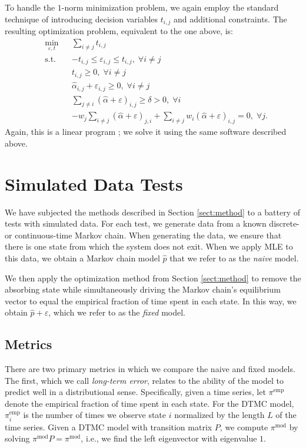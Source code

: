 \documentclass[review,letterpaper,11pt]{elsarticle}
\begin{document}
To handle the $1$-norm minimization problem, we again employ the standard technique of introducing decision variables $t_{i,j}$ and additional constraints.  The resulting optimization problem, equivalent to the one above, is:
\begin{equation}
\label{eqn:ctmcopt2}
\begin{aligned}
& \underset{\varepsilon, t}{\text{min}} && \sum_{i \neq j} t_{i,j} \\
& \text{s.t.}
& & -t_{i,j} \leq \varepsilon_{i,j} \leq t_{i,j}, \;  \forall i \neq j\\
&&& t_{i,j} \geq 0, \;  \forall i \neq j \\
&&& \widehat{\alpha}_{i,j} + \varepsilon_{i,j} \geq 0, \;  \forall i \neq j \\
&&& \sum_{j \neq i} (\widehat{\alpha} + \varepsilon)_{i,j} \geq \delta > 0, \;  \forall i \\
&&& -w_j \sum_{i \neq j} (\widehat{\alpha} + \varepsilon)_{j,i} + \sum_{i \neq j } w_i (\widehat{\alpha} + \varepsilon)_{i,j} = 0, \;  \forall j.
\end{aligned}
\end{equation}
Again, this is a linear program \cite{Nocedal2006}; we solve it using the same software described above.

\section{Simulated Data Tests}
\label{sect:simdata}
We have subjected the methods described in Section \ref{sect:method} to a battery of tests with simulated data.  For each test, we generate data from a known discrete- or continuous-time Markov chain.  When generating the data, we ensure that there is one state from which the system does not exit.  When we apply MLE to this data, we obtain a Markov chain model $\widehat{p}$ that we refer to as the \emph{naive} model.

We then apply the optimization method from Section \ref{sect:method} to remove the absorbing state while simultaneously driving the Markov chain's equilibrium vector to equal the empirical fraction of time spent in each state.  In this way, we obtain $\widehat{p} + \varepsilon$, which we refer to as the \emph{fixed} model.

\subsection{Metrics}
There are two primary metrics in which we compare the naive and fixed models.  The first, which we call \emph{long-term error}, relates to the ability of the model to predict well in a distributional sense.  Specifically, given a time series, let $\pi^\text{emp}$ denote the empirical fraction of time spent in each state.  For the DTMC model, $\pi^\text{emp}_i$ is the number of times we observe state $i$ normalized by the length $L$ of the time series.  Given a DTMC model with transition matrix $P$, we compute $\pi^\text{mod}$ by solving $\pi^\text{mod} P = \pi^\text{mod}$, i.e., we find the left eigenvector with eigenvalue $1$.  
\end{document}
